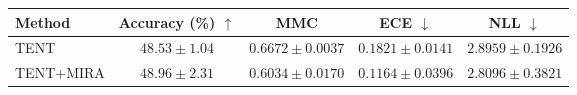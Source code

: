 \begin{tabular}{lcccc}
\toprule
Method & Accuracy (\%) $\uparrow$ & MMC & ECE $\downarrow$ & NLL $\downarrow$ \\
\midrule
TENT & $48.53 \pm 1.04$ & $0.6672 \pm 0.0037$ & $0.1821 \pm 0.0141$ & $2.8959 \pm 0.1926$ \\
TENT+MIRA & $48.96 \pm 2.31$ & $0.6034 \pm 0.0170$ & $0.1164 \pm 0.0396$ & $2.8096 \pm 0.3821$ \\
\bottomrule
\end{tabular}
